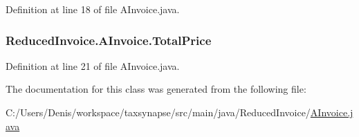 Definition at line 18 of file A\+Invoice.\+java.

\subsubsection[{\texorpdfstring{Total\+Price}{TotalPrice}}]{ Reduced\+Invoice.\+A\+Invoice.\+Total\+Price\hspace{0.3cm}{\ttfamily [protected]}}\hypertarget{class_reduced_invoice_1_1_a_invoice_a72b831e7ee0b4501fc949f61aecdd498}{}\label{class_reduced_invoice_1_1_a_invoice_a72b831e7ee0b4501fc949f61aecdd498}


Definition at line 21 of file A\+Invoice.\+java.



The documentation for this class was generated from the following file\+:\begin{DoxyCompactItemize}
\item 
C\+:/\+Users/\+Denis/workspace/taxsynapse/src/main/java/\+Reduced\+Invoice/\hyperlink{_a_invoice_8java}{A\+Invoice.\+java}\end{DoxyCompactItemize}
